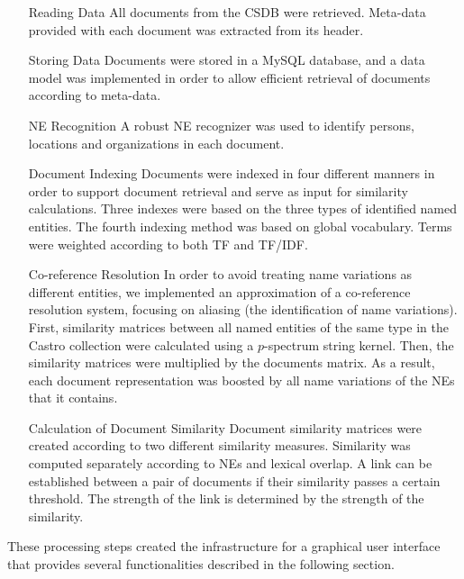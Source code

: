 \begin{enumerate}
\item[Reading Data] All documents from the CSDB were retrieved. Meta-data provided with each document was extracted from its header.
\item[Storing Data] Documents were stored in a MySQL database, and a data model was implemented in order to allow efficient retrieval of documents according to meta-data.
\item[NE Recognition] A robust NE recognizer was used to identify persons, locations and organizations in each document.
\item[Document Indexing] Documents were indexed in four different manners in order to support document retrieval and serve as input for similarity calculations. Three indexes were based on the three types of identified named entities. The fourth indexing method was based on global vocabulary. Terms were weighted according to both TF and TF/IDF.
\item[Co-reference Resolution] In order to avoid treating name variations as different entities, we implemented an approximation of a co-reference resolution system, focusing on aliasing (the identification of name variations).
First, similarity matrices between all named entities of the same type in the Castro collection were calculated using a $p$-spectrum string kernel.
Then, the similarity matrices were multiplied by the documents matrix. As a result, each document representation was boosted by all name 
variations of the NEs that it contains.
\item[Calculation of Document Similarity] Document similarity matrices were created according to two different similarity measures. 
Similarity was computed separately according to NEs and lexical overlap. 
A link can be established between a pair of documents if their similarity passes a certain threshold. 
The strength of the link is determined by the strength of the similarity.
\end{enumerate}

These processing steps created the infrastructure for a graphical user interface that provides several
functionalities described in the following section.

